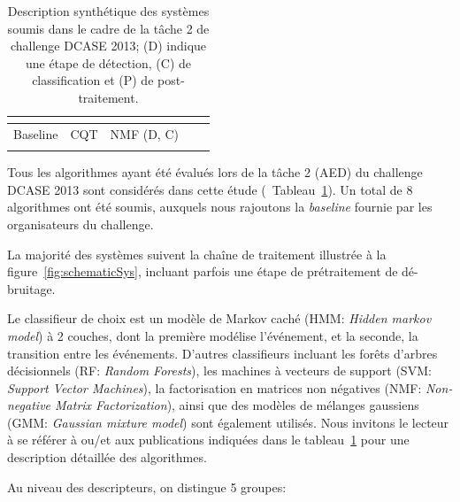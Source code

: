 \begin{table}[t]
\begin{center}
\begin{tabular}{lcccc}
\citep{VVK,gemmeke2013exemplar}     &                      &                              &           &             \\    
\hline
Baseline                            & CQT                  & NMF \hfill  (D, C)           &           &             \\ 
\citep{Giannoulis:2013a}            &                      &                              &           &             \\  
\hline      
\end{tabular}
\end{center}
\caption[Description synthétique des systèmes soumis dans le cadre de la tâche 2 de challenge DCASE 2013.]{Description synthétique des systèmes soumis dans le cadre de la tâche 2 de challenge DCASE 2013; (D) indique une étape de détection, (C) de classification et (P) de post-traitement.}
\label{tab:systemsDcase2013}
\end{table}

Tous les algorithmes ayant été évalués lors de la tâche 2 (AED) du challenge DCASE 2013 sont considérés dans cette étude (\cf~Tableau~\ref{tab:systemsDcase2013}). Un total de 8 algorithmes ont été soumis, auxquels nous rajoutons la \emph{baseline} fournie par les organisateurs du challenge.

La majorité des systèmes suivent la chaîne de traitement illustrée à la figure~\ref{fig:schematicSys}, incluant parfois une étape de prétraitement de dé-bruitage.

Le classifieur de choix est un modèle de Markov caché (HMM: \emph{Hidden markov model}) \citep{Rabiner1989} à 2 couches, dont la première modélise l'événement, et la seconde, la transition entre les événements. D'autres classifieurs incluant les forêts d'arbres décisionnels (RF: \emph{Random Forests}), les machines à vecteurs de support (SVM: \emph{Support Vector Machines}), la factorisation en matrices non négatives (NMF: \emph{Non-negative Matrix Factorization}), ainsi que des modèles de mélanges gaussiens (GMM: \emph{Gaussian mixture model}) sont également utilisés. Nous invitons le lecteur à se référer à \citep{Stowell15} ou/et aux publications indiquées dans le tableau~\ref{tab:systemsDcase2013} pour une description détaillée des algorithmes.

Au niveau des descripteurs, on distingue 5 groupes:

